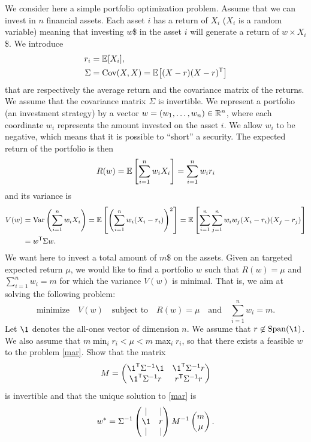 \documentclass[11pt,nocut]{article}
\begin{document}
\begin{problem}[$\star$]
	We consider here a simple portfolio optimization problem.
	Assume that we can invest in $n$ financial assets. Each asset $i$ has a return of $X_i$ ($X_i$ is a random variable) meaning that investing $w$\$ in the asset $i$ will generate a return of $w \times X_i$ \$. We introduce
	\begin{align*}
		r_i &= \mathbb{E}[X_i], \\
		\Sigma &= {{\rm Cov}}(X,X) = \mathbb{E}\big[(X-r) (X-r)^{{\sf T}}\big]
	\end{align*}
	that are respectively the average return and the covariance matrix of the returns. 
	We assume that the covariance matrix $\Sigma$ is invertible. We represent a portfolio (an investment strategy) by a vector $w = (w_1, \dots, w_n) \in \mathbb{R}^n$, where each coordinate $w_i$ represents the amount invested on the asset $i$. 
	We allow $w_i$ to be negative, which means that it is possible to ``short'' a security.
	The expected return of the portfolio is then
	$$
	R(w) = \mathbb{E} \left[\sum_{i=1}^n w_i X_i\right] = \sum_{i=1}^n w_i r_i
	$$
	and its variance is
	\begin{align*}
	V(w) 
	&= {{\rm Var}} \left(\sum_{i=1}^n w_i X_i\right) 
	= \mathbb{E} \left[\left(\sum_{i=1}^n w_i (X_i -r_i)\right)^2\right]
	= \mathbb{E} \left[\sum_{i=1}^n\sum_{j=1}^n w_iw_j (X_i -r_i)(X_j -r_j)\right]
	\\
	&= w^{{\sf T}} \Sigma w.
	\end{align*}
	We want here to invest a total amount of $m$\$ on the assets. 
	Given an targeted expected return $\mu$, we would like to find a portfolio $w$ such that $R(w)=\mu$ and $\sum_{i=1}^n w_i = m$ for which the variance $V(w)$ is minimal.
	That is, we aim at solving the following problem:
	\begin{equation}\label{mar}
		\text{minimize} \quad
		V(w) \quad \text{subject to} \quad
		R(w) = \mu \quad \text{and} \quad \sum_{i=1}^n w_i = m.
	\end{equation}
	Let $\1$ denotes the all-ones vector of dimension $n$. We assume that $r \not\in \Span(\1)$.
	We also assume that $m \min_i r_i < \mu < m \max_i r_i$, so that there exists a feasible $w$ to the problem \eqref{mar}.
	Show that the matrix
	$$
	M = 
	\begin{pmatrix}
		\1^{\sT} \Sigma^{-1} \1 & \1^{\sT} \Sigma^{-1} r \\
		\1^{\sT} \Sigma^{-1} r & r^{\sT} \Sigma^{-1} r
	\end{pmatrix}
	$$
	is invertible and that the unique solution to \eqref{mar} is
	$$
	w^* = \Sigma^{-1} 
	\begin{pmatrix}
		| & | \\
		\1 & r \\
		| & |
	\end{pmatrix}
	M^{-1} 
	\begin{pmatrix}
		m \\
		\mu
	\end{pmatrix}.
	$$
\end{problem}



\vspace{1cm}
\centerline{}

%
%
\end{document}
